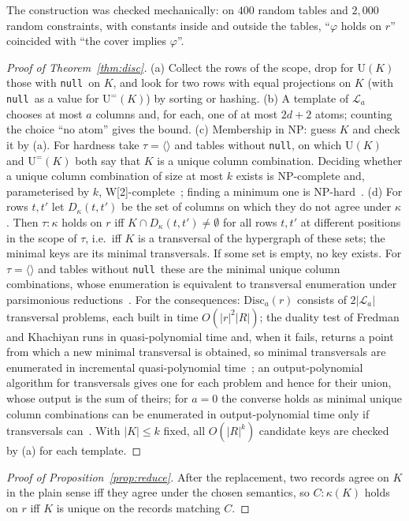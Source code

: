 \documentclass[conference]{IEEEtran}
\theoremstyle{definition}
\newcommand{\nul}{\texttt{null}}
\newcommand{\U}[1]{\mathrm{U}(#1)}
\newcommand{\Ueq}[1]{\mathrm{U}^{=}(#1)}
\newcommand{\tpl}[1]{\ensuremath{\langle #1\rangle}}
\begin{document}
The construction was checked mechanically: on $400$ random tables and $2{,}000$ random
constraints, with constants inside and outside the tables, ``$\varphi$ holds on $r$'' coincided with
``the cover implies $\varphi$''.

\begin{proof}[Proof of Theorem~\ref{thm:disc}]
(a) Collect the rows of the scope, drop for $\U{K}$ those with \nul\ on $K$, and look for two rows
with equal projections on $K$ (with \nul\ as a value for $\Ueq{K}$) by sorting or hashing.
(b) A template of $\mathcal L_a$ chooses at most $a$ columns and, for each, one of at most $2d+2$
atoms; counting the choice ``no atom'' gives the bound.
(c) Membership in NP: guess $K$ and check it by (a). For hardness take $\tau=\tpl{}$ and tables
without \nul, on which $\U{K}$ and $\Ueq{K}$ both say that $K$ is a unique column combination.
Deciding whether a unique column combination of size at most $k$ exists is NP-complete and,
parameterised by $k$, W[2]-complete~\cite{BFS22}; finding a minimum one is NP-hard~\cite{SR92}.
(d) For rows $t,t'$ let $D_\kappa(t,t')$ be the set of columns on which they do not agree under
$\kappa$. Then $\tau:\kappa$ holds on $r$ iff $K\cap D_\kappa(t,t')\neq\emptyset$ for all rows $t,t'$ at
different positions in the scope of $\tau$, i.e.\ iff $K$ is a transversal of the hypergraph of
these sets; the minimal keys are its minimal transversals. If some set is empty, no key exists.
For $\tau=\tpl{}$ and tables without \nul\ these are the minimal unique column combinations, whose
enumeration is equivalent to transversal enumeration under parsimonious
reductions~\cite{BFS22}. For the consequences: $\mathrm{Disc}_a(r)$ consists of
$2|\mathcal L_a|$ transversal problems, each built in time $O(|r|^2|R|)$; the duality test of
Fredman and Khachiyan runs in quasi-polynomial time and, when it fails, returns a point from
which a new minimal transversal is obtained, so minimal transversals are enumerated in
incremental quasi-polynomial time~\cite{FK96}; an output-polynomial algorithm for transversals gives one for each problem and
hence for their union, whose output is the sum of theirs; for $a=0$ the converse holds as minimal
unique column combinations can be enumerated in output-polynomial time only if transversals
can~\cite{EG95,BFS22}. With $|K|\le k$ fixed, all $O(|R|^k)$ candidate keys are checked by (a)
for each template.
\end{proof}

\begin{proof}[Proof of Proposition~\ref{prop:reduce}]
After the replacement, two records agree on $K$ in the plain sense iff they agree under the
chosen semantics, so $C:\kappa(K)$ holds on $r$ iff $K$ is unique on the records matching $C$.
\end{proof}
\end{document}
